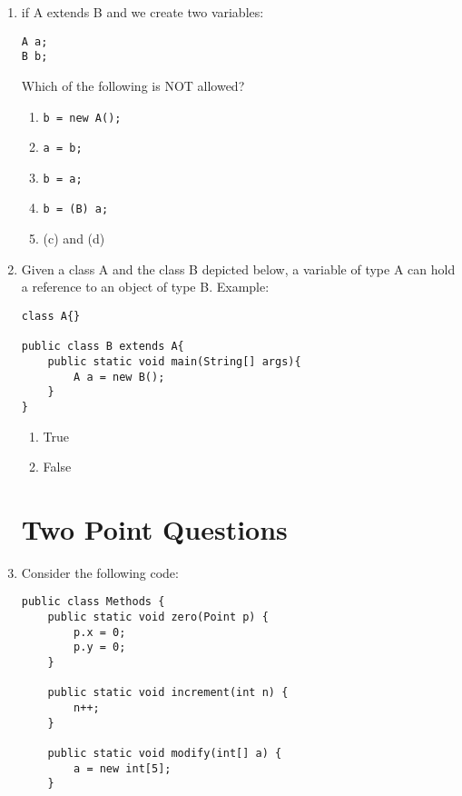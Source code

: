 \documentclass[CS180-S16-FinalExam.tex]{subfiles}
\begin{document}
\begin{enumerate}
\item if A extends B and we create two variables:
\begin{lstlisting}
A a;
B b;
\end{lstlisting}
Which of the following is NOT allowed?
\begin{enumerate}
\item \texttt{b = new A();}
\item \texttt{a = b;}
\item \texttt{b = a;} \ifdraft \Ans \fi
\item \texttt{b = (B) a;}
\item (c) and (d) 
\end{enumerate}
\item Given a class A  and the class B depicted below, a variable of type A can hold a reference to an object of type B. \newline
Example:
\begin{lstlisting}
class A{}

public class B extends A{
	public static void main(String[] args){
    	A a = new B();
    }
}

\end{lstlisting}
\begin{enumerate}
\item True\ifdraft \Ans \fi
\item False 
\end{enumerate}


\clearpage

\section*{Two Point Questions}
\label{sec:two}

\item 
Consider the following code:
\begin{lstlisting}
public class Methods {
	public static void zero(Point p) {
		p.x = 0;
    	p.y = 0;
	}

	public static void increment(int n) {
		n++;
	}

	public static void modify(int[] a) {
		a = new int[5];
	}
    

\end{lstlisting}
\end{enumerate}
\end{document}
